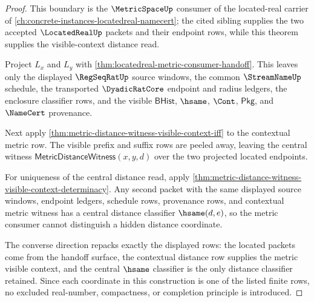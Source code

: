\begin{proof}
This boundary is the $\MetricSpaceUp$ consumer of the located-real carrier of
\autoref{ch:concrete-instances-locatedreal-namecert}; the cited sibling
supplies the two accepted $\LocatedRealUp$ packets and their endpoint rows,
while this theorem supplies the visible-context distance read.

Project $L_x$ and $L_y$ with
\autoref{thm:locatedreal-metric-consumer-handoff}. This leaves only the
displayed $\RegSeqRatUp$ source windows, the common $\StreamNameUp$ schedule,
the transported $\DyadicRatCore$ endpoint and radius ledgers, the enclosure
classifier rows, and the visible $\mathsf{BHist}$, $\hsame$, $\Cont$,
$\mathsf{Pkg}$, and $\NameCert$ provenance.

Next apply \autoref{thm:metric-distance-witness-visible-context-iff} to the
contextual metric row. The visible prefix and suffix rows are peeled away,
leaving the central witness $\mathsf{MetricDistanceWitness}(x,y,d)$ over the
two projected located endpoints.

For uniqueness of the central distance read, apply
\autoref{thm:metric-distance-witness-visible-context-determinacy}. Any second
packet with the same displayed source windows, endpoint ledgers, schedule
rows, provenance rows, and contextual metric witness has a central distance
classifier $\hsame(d,e)$, so the metric consumer cannot distinguish a hidden
distance coordinate.

The converse direction repacks exactly the displayed rows: the located packets
come from the handoff surface, the contextual distance row supplies the metric
visible context, and the central $\hsame$ classifier is the only distance
classifier retained. Since each coordinate in this construction is one of the
listed finite rows, no excluded real-number, compactness, or completion
principle is introduced.
\end{proof}
